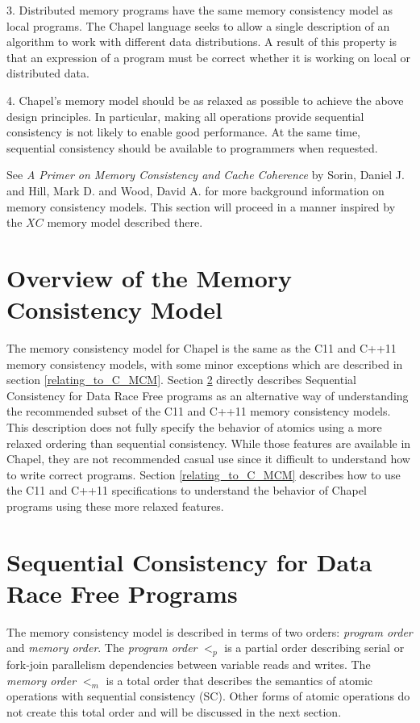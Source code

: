 3. Distributed memory programs have the same memory consistency model as local
   programs. The Chapel language seeks to allow a single description of an
   algorithm to work with different data distributions. A result of this
   property is that an expression of a program must be correct whether it is
   working on local or distributed data.

4. Chapel's memory model should be as relaxed as possible to achieve the above
   design principles. In particular, making all operations provide sequential
   consistency is not likely to enable good performance. At the same time,
   sequential consistency should be available to programmers when requested.

See \textit{A Primer on Memory Consistency and Cache Coherence} by Sorin,
Daniel J. and Hill, Mark D. and Wood, David A. for more background information
on memory consistency models. This section will proceed in a manner inspired by
the $XC$ memory model described there.

\section{Overview of the Memory Consistency Model}

The memory consistency model for Chapel is the same as the C11 and C++11 memory
consistency models, with some minor exceptions which are described in section
\ref{relating_to_C_MCM}. Section \ref{SC_for_DRF} directly describes Sequential
Consistency for Data Race Free programs as an alternative way of understanding
the recommended subset of the C11 and C++11 memory consistency models. This
description does not fully specify the behavior of atomics using a more relaxed
ordering than sequential consistency. While those features are available in
Chapel, they are not recommended casual use since it difficult to understand
how to write correct programs. Section \ref{relating_to_C_MCM} describes how to
use the C11 and C++11 specifications to understand the behavior of Chapel
programs using these more relaxed features.

\section{Sequential Consistency for Data Race Free Programs}
\label{SC_for_DRF}

The memory consistency model is described in terms of two orders:
\textit{program order} and \textit{memory order}. The \textit{program order}
$<_p$ is a partial order describing serial or fork-join parallelism
dependencies between variable reads and writes. The \textit{memory order} $<_m$
is a total order that describes the semantics of atomic operations with
sequential consistency (SC). Other forms of atomic operations do not create
this total order and will be discussed in the next section.

